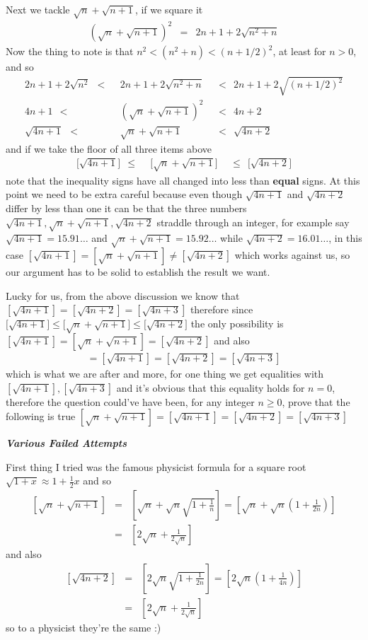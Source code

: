 \documentclass[aps,preprint,preprintnumbers,nofootinbib,showpacs,prd]{revtex4-1}
\newcommand{\nbea}{\begin{eqnarray*}}
\newcommand{\neea}{\end{eqnarray*}}
\begin{document}
Next we tackle $\sqrt{n} + \sqrt{n+1}$, if we square it
%
\nbea
\left ( \sqrt{n} + \sqrt{n+1}\right )^2 & = & 2n + 1 + 2\sqrt{n^2 + n}
\neea
%
Now the thing to note is that $n^2 < (n^2 + n) < (n + 1/2)^2$, at least for $n>0$, and so
%
\nbea
2n + 1 + 2\sqrt{n^2} ~~<~~& 2n + 1 + 2\sqrt{n^2 + n}& ~~ < ~~ 2n + 1 + 2\sqrt{(n + 1/2)^2} \\
4n + 1 ~~<~~& \left ( \sqrt{n} + \sqrt{n+1}\right )^2 & ~~ < ~~ 4n + 2 \\
\sqrt{4n + 1} ~~<~~& \sqrt{n} + \sqrt{n+1} & ~~ < ~~ \sqrt{4n + 2}
\neea
%
and if we take the floor of all three items above
%
\nbea
\lbrack\sqrt{4n + 1}\rbrack ~~\le~~&\lbrack \sqrt{n} + \sqrt{n+1}\rbrack & ~~ \le ~~\lbrack \sqrt{4n + 2}\rbrack
\neea
%
note that the inequality signs have all changed into less than {\bf equal} signs. At this point we need to be extra careful because even though $\sqrt{4n + 1}$ and $\sqrt{4n + 2}$ differ by less than one it can be that the three numbers $\sqrt{4n + 1},\sqrt{n} + \sqrt{n+1},\sqrt{4n + 2}$ straddle through an integer, for example say $\sqrt{4n + 1} = 15.91\ldots$ and $\sqrt{n} + \sqrt{n+1} = 15.92\ldots$ while $\sqrt{4n + 2} = 16.01\ldots$, in this case $[\sqrt{4n+1}]=[\sqrt{n} + \sqrt{n+1}] \neq [\sqrt{4n+2}]$ which works against us, so our argument has to be solid to establish the result we want.

Lucky for us, from the above discussion we know that $[\sqrt{4n+1}]=[\sqrt{4n+2}]=[\sqrt{4n+3}]$ therefore since $\lbrack\sqrt{4n + 1}\rbrack \le \lbrack \sqrt{n} + \sqrt{n+1}\rbrack \le \lbrack \sqrt{4n + 2}\rbrack$ the only possibility is $[\sqrt{4n+1}]=[\sqrt{n} + \sqrt{n+1}] = [\sqrt{4n+2}]$ and also
%
\nbea
[\sqrt{n} + \sqrt{n+1}]=[\sqrt{4n+1}]=[\sqrt{4n+2}]=[\sqrt{4n+3}]
\neea
%
which is what we are after and more, for one thing we get equalities with $[\sqrt{4n+1}], [\sqrt{4n+3}]$ and it's obvious that this equality holds for $n=0$, therefore the question could've have been, for any integer $n \ge 0$, prove that the following is true $[\sqrt{n} + \sqrt{n+1}]=[\sqrt{4n+1}]=[\sqrt{4n+2}]=[\sqrt{4n+3}]$

\bigskip
\textit{\textbf{Various Failed Attempts}}
\smallskip

First thing I tried was the famous physicist formula for a square root $\sqrt{1+x}\approx 1 + \frac{1}{2}x$ and so
%
\nbea
\left \lbrack \sqrt{n} + \sqrt{n+1}\right \rbrack & = & \left \lbrack \sqrt{n} + \sqrt{n}\sqrt{1 + \frac{1}{n}} \right \rbrack = \left \lbrack \sqrt{n} + \sqrt{n}\left (1 + \frac{1}{2n}\right ) \right \rbrack \\
& = & \left \lbrack 2\sqrt{n} + \frac{1}{2\sqrt{n}} \right \rbrack
\neea
%
and also
%
\nbea
\left \lbrack \sqrt{4n+2}\right \rbrack & = & \left \lbrack 2\sqrt{n}\sqrt{1 + \frac{1}{2n}} \right \rbrack =  \left \lbrack 2\sqrt{n}\left (1 + \frac{1}{4n}\right ) \right \rbrack \\
& = & \left \lbrack 2\sqrt{n}+ \frac{1}{2\sqrt{n}} \right \rbrack
\neea
%
so to a physicist they're the same :)
\end{document}
